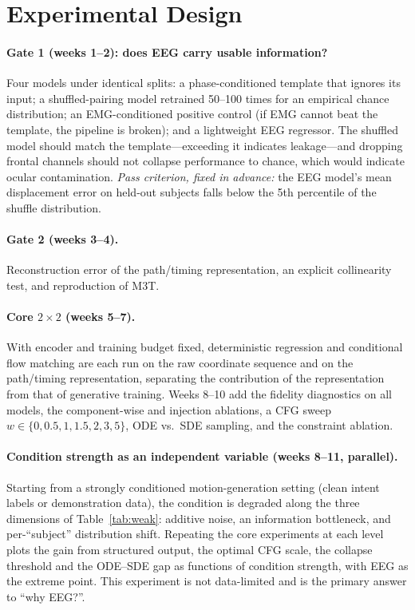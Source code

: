 \documentclass[11pt]{article}
\begin{document}
\section{Experimental Design}

\paragraph{Gate 1 (weeks 1--2): does EEG carry usable information?} Four models under identical splits: a phase-conditioned template that ignores its input; a shuffled-pairing model retrained 50--100 times for an empirical chance distribution; an EMG-conditioned positive control (if EMG cannot beat the template, the pipeline is broken); and a lightweight EEG regressor. The shuffled model should match the template---exceeding it indicates leakage---and dropping frontal channels should not collapse performance to chance, which would indicate ocular contamination. \emph{Pass criterion, fixed in advance:} the EEG model's mean displacement error on held-out subjects falls below the 5th percentile of the shuffle distribution.

\paragraph{Gate 2 (weeks 3--4).} Reconstruction error of the path/timing representation, an explicit collinearity test, and reproduction of M3T.

\paragraph{Core $2\times2$ (weeks 5--7).} With encoder and training budget fixed, deterministic regression and conditional flow matching are each run on the raw coordinate sequence and on the path/timing representation, separating the contribution of the representation from that of generative training. Weeks 8--10 add the fidelity diagnostics on all models, the component-wise and injection ablations, a CFG sweep $w\in\{0,0.5,1,1.5,2,3,5\}$, ODE vs.\ SDE sampling, and the constraint ablation.

\paragraph{Condition strength as an independent variable (weeks 8--11, parallel).} Starting from a strongly conditioned motion-generation setting (clean intent labels or demonstration data), the condition is degraded along the three dimensions of Table~\ref{tab:weak}: additive noise, an information bottleneck, and per-``subject'' distribution shift. Repeating the core experiments at each level plots the gain from structured output, the optimal CFG scale, the collapse threshold and the ODE--SDE gap as functions of condition strength, with EEG as the extreme point. This experiment is not data-limited and is the primary answer to ``why EEG?''.
\end{document}
